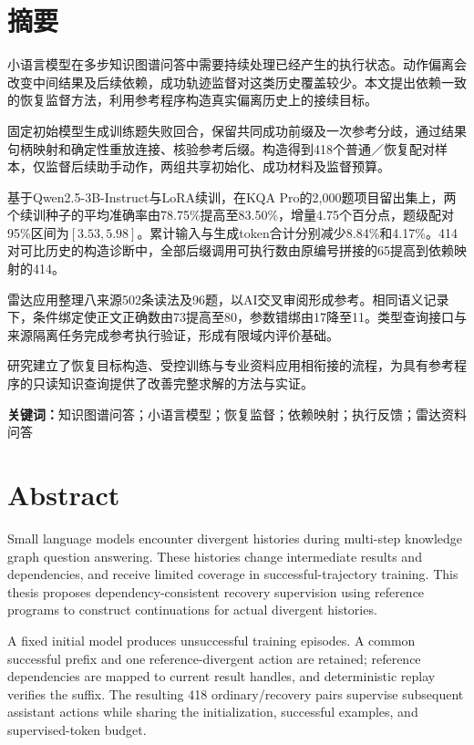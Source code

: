 \chapter*{摘\quad 要}

小语言模型在多步知识图谱问答中需要持续处理已经产生的执行状态。动作偏离会改变中间结果及后续依赖，成功轨迹监督对这类历史覆盖较少。本文提出依赖一致的恢复监督方法，利用参考程序构造真实偏离历史上的接续目标。

固定初始模型生成训练题失败回合，保留共同成功前缀及一次参考分歧，通过结果句柄映射和确定性重放连接、核验参考后缀。构造得到418个普通／恢复配对样本，仅监督后续助手动作，两组共享初始化、成功材料及监督预算。

基于Qwen2.5-3B-Instruct与LoRA续训，在KQA Pro的2,000题项目留出集上，两个续训种子的平均准确率由78.75\%提高至83.50\%，增量4.75个百分点，题级配对95\%区间为$[3.53,5.98]$。累计输入与生成token合计分别减少8.84\%和4.17\%。414对可比历史的构造诊断中，全部后缀调用可执行数由原编号拼接的65提高到依赖映射的414。

雷达应用整理八来源502条读法及96题，以AI交叉审阅形成参考。相同语义记录下，条件绑定使正文正确数由73提高至80，参数错绑由17降至11。类型查询接口与来源隔离任务完成参考执行验证，形成有限域内评价基础。

研究建立了恢复目标构造、受控训练与专业资料应用相衔接的流程，为具有参考程序的只读知识查询提供了改善完整求解的方法与实证。

\noindent\textbf{关键词：}知识图谱问答；小语言模型；恢复监督；依赖映射；执行反馈；雷达资料问答

\chapter*{Abstract}

Small language models encounter divergent histories during multi-step knowledge graph question answering. These histories change intermediate results and dependencies, and receive limited coverage in successful-trajectory training. This thesis proposes dependency-consistent recovery supervision using reference programs to construct continuations for actual divergent histories.

A fixed initial model produces unsuccessful training episodes. A common successful prefix and one reference-divergent action are retained; reference dependencies are mapped to current result handles, and deterministic replay verifies the suffix. The resulting 418 ordinary/recovery pairs supervise subsequent assistant actions while sharing the initialization, successful examples, and supervised-token budget.

